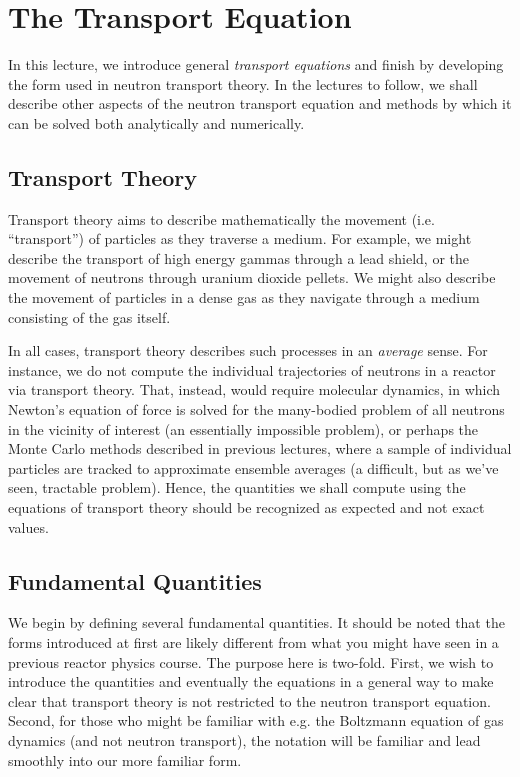 \chapter{The Transport Equation}

In this lecture, we introduce general \textit{transport equations} and finish by developing the form used in neutron transport theory.  In the lectures to follow, we shall describe other aspects of the neutron transport equation and methods by which it can be solved both analytically and numerically.

\section*{Transport Theory}

Transport theory aims to describe mathematically the movement (i.e. ``transport'') of particles as they traverse a medium.  For example, we might describe the transport of high energy gammas through a lead shield, or the movement of neutrons through uranium dioxide pellets.  We might also describe the movement of particles in a dense gas as they navigate through a medium consisting of the gas itself.

In all cases, transport theory describes such processes in an \textit{average} sense.  For instance, we do not compute the individual trajectories of neutrons in a reactor via transport theory.  That, instead, would require molecular dynamics, in which Newton's equation of force is solved for the many-bodied problem of all neutrons in the vicinity of interest (an essentially impossible problem), or perhaps the Monte Carlo methods described in previous lectures, where a sample of individual particles are tracked to approximate ensemble averages (a difficult, but as we've seen, tractable problem).  Hence, the quantities we shall compute using the equations of transport theory should be recognized as expected and not exact values.

\section*{Fundamental Quantities}

We begin by defining several fundamental quantities.  It should be noted that the forms introduced at first are likely different from what you might have seen in a previous reactor physics course.  The purpose here is two-fold.  First, we wish to introduce the quantities and eventually the equations in a general way to make clear that transport theory is not restricted to the neutron transport equation.  Second, for those who might be familiar with e.g. the Boltzmann equation of gas dynamics (and not neutron transport), the notation will be familiar and lead smoothly into our more familiar form.


